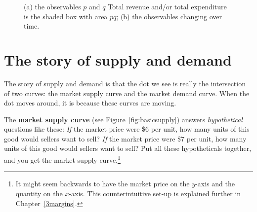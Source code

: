 %
\begin{figure}[h]
\centering
{}
%
\hspace{2cm}
%
\caption{(a) the observables $p$ and $q$ Total revenue and/or total expenditure is the shaded box with area $pq$; (b) the observables changing over time.}
\label{fig:observables1} %
\end{figure}
%





\section{The story of supply and demand}

The story of supply and demand is that the dot we see is really the intersection of two curves: the market supply curve and the market demand curve. When the dot moves around, it is because these curves are moving.

The \textbf{market supply curve} (see Figure~\ref{fig:basicsupply}) answers \emph{hypothetical} questions like these: \emph{If} the market price were \$6 per unit, how many units of this good would sellers want to sell? \emph{If} the market price were \$7 per unit, how many units of this good would sellers want to sell? Put all these hypotheticals together, and you get the market supply curve.\footnote{It might seem backwards to have the market price on the $y$-axis and the quantity on the $x$-axis. This counterintuitive set-up is explained further in Chapter~\ref{3margins}.}

